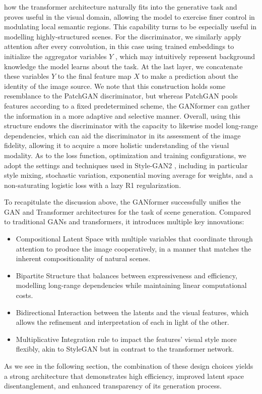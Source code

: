 \documentclass{article}
\begin{document}
	how the transformer architecture naturally fits into the generative task and proves useful in the 
	visual domain, allowing the model to exercise finer control in modulating local semantic regions. This 
	capability turns to be especially useful in modelling highly-structured scenes.
	For the discriminator, we similarly apply attention after every convolution, in this case using trained 
	embeddings to initialize the aggregator variables $Y$ , which may intuitively represent background 
	knowledge the model learns about the task. At the last layer, we concatenate these variables $Y$ to 
	the final feature map $X$ to make a prediction about the identity of the image source. We note that 
	this construction holds some resemblance to the PatchGAN discriminator, but 
	whereas PatchGAN pools features according to a fixed predetermined scheme, the GANformer can 
	gather the information in a more adaptive and selective manner. Overall, using this structure endows 
	the discriminator with the capacity to likewise model long-range dependencies, which can aid the 
	discriminator in its assessment of the image fidelity, allowing it to acquire a more holistic 
	understanding of the visual modality.
	As to the loss function, optimization and training configurations, we adopt the settings and 
	techniques used in Style-GAN2 \cite{karras2020analyzing}, including in particular style mixing, 
	stochastic variation, exponential moving average for weights, and a non-saturating logistic loss with 
	a lazy R1 regularization.
	
	To recapitulate the discussion above, the GANformer successfully unifies the GAN and Transformer 
	architectures for the task of scene generation. Compared to traditional GANs and transformers, it 
	introduces multiple key innovations:
	\begin{itemize}
		\item Compositional Latent Space with multiple variables that coordinate through attention to 
		produce the image cooperatively, in a manner that matches the inherent compositionality of 
		natural scenes.
		\item Bipartite Structure that balances between expressiveness and efficiency, modelling 
		long-range dependencies while maintaining linear computational costs.
		\item Bidirectional Interaction between the latents and the visual features, which allows the 
		refinement and interpretation of each in light of the other.
		\item Multiplicative Integration rule to impact the features' visual style more flexibly, akin to 
		StyleGAN but in contrast to the transformer network.
	\end{itemize}
	As we see in the following section, the combination of these design choices yields a strong 
	architecture that demonstrates high efficiency, improved latent space disentanglement, and 
	enhanced transparency of its generation process.
	
\end{document}
